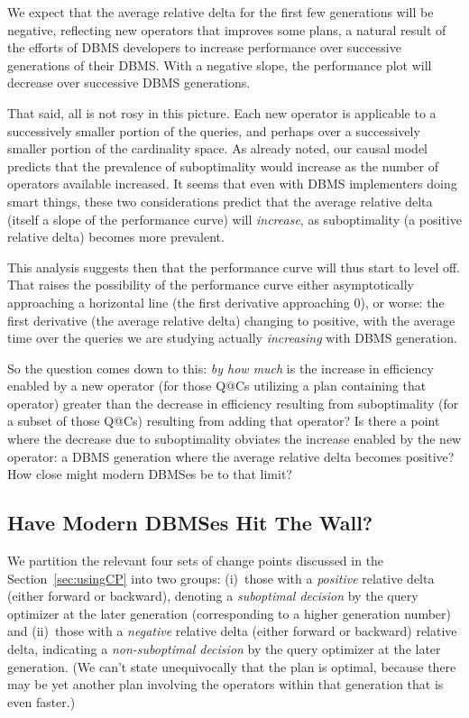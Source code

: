 \documentclass[prodmode,acmtods]{acmsmall}
\begin{document}
We expect that the average relative delta for the first few generations will
be negative, reflecting new operators that improves some plans, a natural
result of the \hbox{efforts} of \hbox{DBMS} developers to increase performance over
successive generations of their \hbox{DBMS}.  With a negative slope, the
performance plot will decrease over successive DBMS generations.

That said, all is not rosy in this picture. Each new operator is applicable
to a successively smaller portion of the queries, and perhaps over a
successively smaller portion of the cardinality space.  As already noted,
our causal model predicts that the prevalence of suboptimality would
increase as the number of operators available increased.  It seems that even
with DBMS implementers doing smart things, these two considerations predict
that the average relative delta (itself a slope of the performance curve)
will {\em increase}, as suboptimality (a positive relative delta) becomes
more prevalent.

This analysis suggests then that the performance curve will thus start to
level off. That raises the
possibility of the performance curve either asymptotically approaching a horizontal line
(the first derivative approaching 0), or worse: the first derivative (the
average relative delta)
changing to positive, with the average time over the queries we are studying
actually {\em increasing} with \hbox{DBMS} generation. 

So the question comes down to this:  {\em by
how much} is the increase in efficiency enabled by a new operator (for those
Q@Cs utilizing a plan containing that operator) greater than the decrease in
efficiency resulting from suboptimality (for a subset of those Q@Cs)
resulting from adding that operator? Is there a
point where the decrease due to suboptimality obviates the increase enabled
by the new operator: a DBMS generation where the average relative delta
becomes positive? How close might modern \hbox{DBMSes} be to that limit?

\subsection{Have Modern DBMSes Hit The Wall?}\label{sec:hitthewall}
We partition the relevant four sets of change points discussed in the
Section~\ref{sec:usingCP} into two groups: (i)~those
with a {\em positive} relative delta (either forward or backward), denoting a
{\em suboptimal decision} by the query optimizer at the later generation
(corresponding to a higher generation number)
and (ii)~those with a {\em negative} relative delta (either forward or
backward) relative delta, indicating a {\em non-suboptimal decision} by the
query optimizer at the later generation. (We can't state unequivocally that
the plan is optimal, because there may be yet another plan involving the
operators within that generation that is even faster.)
\end{document}
